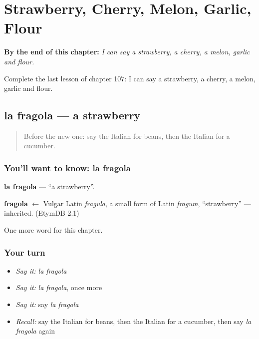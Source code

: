 
\chapter{Strawberry, Cherry, Melon, Garlic, Flour}
\label{ch:it-strawberry-cherry-melon-garlic-flour}

\begin{chapteropening}
\textbf{By the end of this chapter:} \emph{I can say a strawberry, a cherry, a melon, garlic and flour.}

Complete the last lesson of chapter 107: I can say a strawberry, a cherry, a melon, garlic and flour.
\end{chapteropening}

\section[la fragola]{la fragola — a strawberry}

\label{lesson:IT-C107-fragola}



\begin{quote}
Before the new one: say the Italian for beans, then the Italian for a cucumber.
\end{quote}

\subsection*{You'll want to know: la fragola}
\textbf{la fragola} — \textquotedblleft{}a strawberry\textquotedblright{}.

\begin{cousinweb}
\textbf{fragola} $\leftarrow$ Vulgar Latin \emph{fragula}, a small form of Latin \emph{fragum}, \textquotedblleft{}strawberry\textquotedblright{} — inherited. (EtymDB 2.1)
\end{cousinweb}

\begin{grammarlens}[title={What you've built}]
One more word for this chapter.
\end{grammarlens}

\subsection*{Your turn}
\begin{itemize}
\raggedright
  \item \emph{Say it:} \emph{la fragola}
  \item \emph{Say it:} \emph{la fragola}, once more
  \item \emph{Say it:} say \emph{la fragola}
  \item \emph{Recall:} say the Italian for beans, then the Italian for a cucumber, then say \emph{la fragola} again
\end{itemize}

